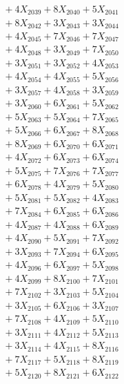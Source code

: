 \documentclass[a4paper,10pt]{article}
\begin{document}
{\begin{align}
&\;  + 4 X_{2039} + 8 X_{2040} + 5 X_{2041} \\[0.3ex]
&\;  + 8 X_{2042} + 3 X_{2043} + 3 X_{2044} \\[0.3ex]
&\;  + 4 X_{2045} + 7 X_{2046} + 7 X_{2047} \\[0.3ex]
&\;  + 4 X_{2048} + 3 X_{2049} + 7 X_{2050} \\[0.5ex]\allowbreak
&\;  + 3 X_{2051} + 3 X_{2052} + 4 X_{2053} \\[0.3ex]
&\;  + 4 X_{2054} + 4 X_{2055} + 5 X_{2056} \\[0.3ex]
&\;  + 3 X_{2057} + 4 X_{2058} + 3 X_{2059} \\[0.3ex]
&\;  + 3 X_{2060} + 6 X_{2061} + 5 X_{2062} \\[0.3ex]
&\;  + 5 X_{2063} + 5 X_{2064} + 7 X_{2065} \\[0.3ex]
&\;  + 5 X_{2066} + 6 X_{2067} + 8 X_{2068} \\[0.3ex]
&\;  + 8 X_{2069} + 6 X_{2070} + 6 X_{2071} \\[0.3ex]
&\;  + 4 X_{2072} + 6 X_{2073} + 6 X_{2074} \\[0.3ex]
&\;  + 5 X_{2075} + 7 X_{2076} + 7 X_{2077} \\[0.3ex]
&\;  + 6 X_{2078} + 4 X_{2079} + 5 X_{2080} \\[0.5ex]\allowbreak
&\;  + 5 X_{2081} + 5 X_{2082} + 4 X_{2083} \\[0.3ex]
&\;  + 7 X_{2084} + 6 X_{2085} + 6 X_{2086} \\[0.3ex]
&\;  + 4 X_{2087} + 4 X_{2088} + 6 X_{2089} \\[0.3ex]
&\;  + 4 X_{2090} + 5 X_{2091} + 7 X_{2092} \\[0.3ex]
&\;  + 3 X_{2093} + 7 X_{2094} + 6 X_{2095} \\[0.3ex]
&\;  + 4 X_{2096} + 6 X_{2097} + 5 X_{2098} \\[0.3ex]
&\;  + 4 X_{2099} + 8 X_{2100} + 7 X_{2101} \\[0.3ex]
&\;  + 7 X_{2102} + 3 X_{2103} + 5 X_{2104} \\[0.3ex]
&\;  + 3 X_{2105} + 6 X_{2106} + 3 X_{2107} \\[0.3ex]
&\;  + 7 X_{2108} + 4 X_{2109} + 5 X_{2110} \\[0.5ex]\allowbreak
&\;  + 3 X_{2111} + 4 X_{2112} + 5 X_{2113} \\[0.3ex]
&\;  + 3 X_{2114} + 4 X_{2115} + 8 X_{2116} \\[0.3ex]
&\;  + 7 X_{2117} + 5 X_{2118} + 8 X_{2119} \\[0.3ex]
&\;  + 5 X_{2120} + 8 X_{2121} + 6 X_{2122} \\[0.3ex]

\end{align}}
\end{document}
